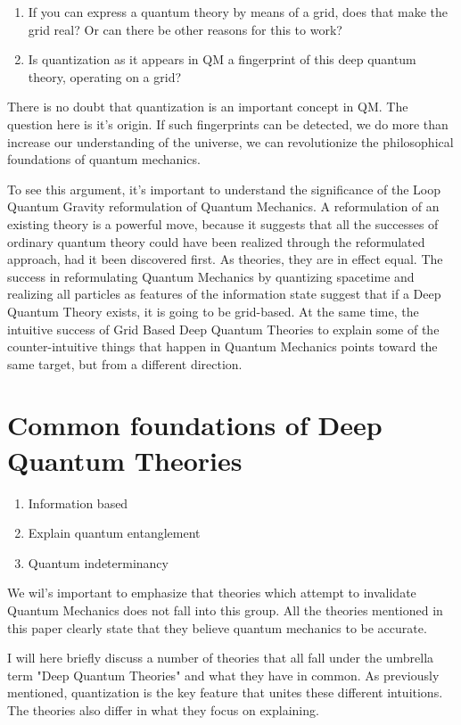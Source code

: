 \documentclass[notitlepage]{report}
\begin{document}
\begin{enumerate}
\item If you can express a quantum theory by means of a grid, does that make the grid real? Or can there be other reasons for this to work?
\item Is quantization as it appears in QM a fingerprint of this deep quantum theory, operating on a grid?
\end{enumerate}

There is no doubt that quantization is an important concept in QM. The question here is it's origin. If such fingerprints can be detected, we do more than increase our understanding of the universe, we can revolutionize the philosophical foundations of quantum mechanics. 

To see this argument, it's important to understand the significance of the Loop Quantum Gravity reformulation of Quantum Mechanics. A reformulation of an existing theory is a powerful move, because it suggests that all the successes of ordinary quantum theory could have been realized through the reformulated approach, had it been discovered first. As theories, they are in effect equal. The success in reformulating Quantum Mechanics by quantizing spacetime and realizing all particles as features of the information state suggest that if a Deep Quantum Theory exists, it is going to be grid-based. At the same time, the intuitive success of Grid Based Deep Quantum Theories to explain some of the counter-intuitive things that happen in Quantum Mechanics points toward the same target, but from a different direction.

\section*{Common foundations of Deep Quantum Theories}

\begin{enumerate}
\item Information based
\item Explain quantum entanglement
\item Quantum indeterminancy
\end{enumerate}


We wil's important to emphasize that theories which attempt to invalidate Quantum Mechanics does not fall into this group. All the theories mentioned in this paper clearly state that they believe quantum mechanics to be accurate. 

I will here briefly discuss a number of theories that all fall under the umbrella term "Deep Quantum Theories" and what they have in common. As previously mentioned, quantization is the key feature that unites these different intuitions. The theories also differ in what they focus on explaining.
\end{document}
